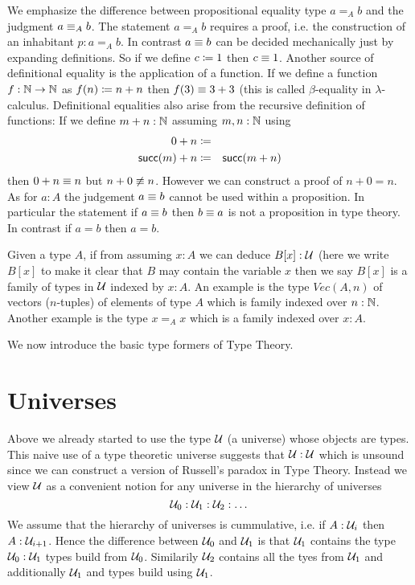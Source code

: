 We emphasize the difference between propositional equality type $a =_A
b$ and the judgment $a \equiv_A b$. The statement $a =_A b$ requires a
proof, i.e. the construction of an inhabitant $p : a =_A b$. In
contrast $a \equiv b$ can be decided mechanically just by expanding
definitions. So if we define $c \coloneqq 1$ then $c\equiv 1$. Another
source of definitional equality is the application of a function. If
we define a function $f : \mathbb{N} \to \mathbb{N}$ as $f(n) \coloneqq n + n$ then
$f(3) \equiv 3+3$ (this is called $\beta$-equality in
$\lambda$-calculus. Definitional equalities also arise from the
recursive definition of functions: If we define $m + n : \mathbb{N}$
assuming $m,n : \mathbb{N}$ using
\begin{eqnarray*}
  0 + n & \coloneqq & \\
  \mathsf{succ}(m) + n & \coloneqq & \mathsf{succ}(m + n)
\end{eqnarray*}
then $0 + n \equiv n$ but $n + 0 \not\equiv n$. However we can construct
a proof of $n + 0 = n$. As for $a : A$ the judgement $a \equiv b$
cannot be used within a proposition. In particular the statement if $a
\equiv b$ then $b \equiv a$ is not a proposition in type theory. In
contrast if $a = b$ then $a = b$.

Given a type $A$, if from assuming $x:A$ we can deduce $B[x]:{\mathcal U}$ 
(here we write $B[x]$ to make it clear that $B$ may contain the
variable $x$ then we say $B[x]$ is a
family of types in ${\mathcal U}$ indexed by $x:A$. An example is the type $Vec(A,n)$ of
vectors ($n$-tuples) of elements of type $A$ which is family indexed
over $n : \mathbb{N}$. Another example is the type $x =_A x$ which is a
family indexed over $x : A$.

We now introduce the basic type formers of Type Theory.

\section{Universes}
\label{sec:universes}

Above we already started to use the type ${\mathcal U}$ (a universe) whose objects are
types. This naive use of a type theoretic universe suggests that ${\mathcal U}
: {\mathcal U}$ which is unsound since we can construct a version of Russell's
paradox in Type Theory. Instead we view ${\mathcal U}$ as a convenient notion
for any universe in the hierarchy of universes 
\[ {\mathcal U}_0 : {\mathcal U}_1 : {\mathcal U}_2 : \dots \]
We assume that the hierarchy of universes is cummulative, i.e. if
$A:{\mathcal U}_i$ then $A : {\mathcal U}_{i+1}$. Hence the difference between
${\mathcal U}_0$ and ${\mathcal U}_1$ is that ${\mathcal U}_1$ contains the type ${\mathcal U}_0:{\mathcal U}_1$
types build from ${\mathcal U}_0$. Similarily ${\mathcal U}_2$ contains all the tyes
from ${\mathcal U}_1$ and additionally ${\mathcal U}_1$ and types build using ${\mathcal U}_1$. 

